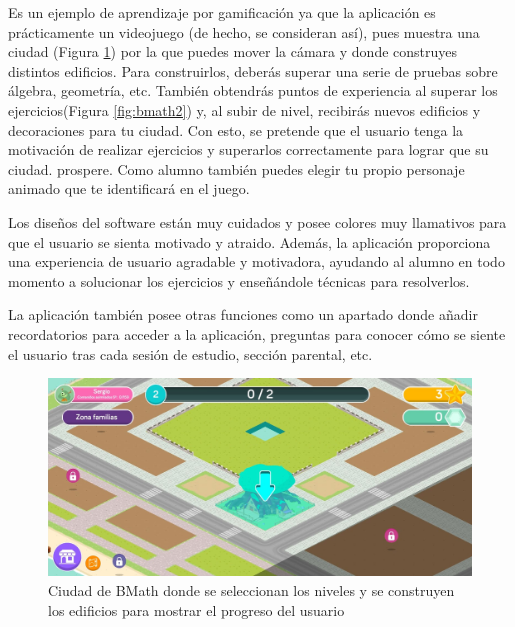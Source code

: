 Es un ejemplo de aprendizaje por gamificación ya que la aplicación es prácticamente un videojuego (de hecho, se consideran así), pues muestra una ciudad
(Figura \ref{fig:bmath}) por la que puedes mover la cámara y donde construyes distintos edificios. Para construirlos, deberás superar
una serie de pruebas sobre álgebra, geometría, etc. También obtendrás puntos de experiencia al superar los ejercicios(Figura \ref{fig:bmath2}) y, al subir de nivel, recibirás nuevos edificios y decoraciones para tu ciudad.
Con esto, se pretende que el usuario tenga la motivación de realizar ejercicios y superarlos correctamente para lograr que su ciudad.
prospere. Como alumno también puedes elegir tu propio personaje animado que te identificará en el juego.

Los diseños del software están muy cuidados y posee colores muy llamativos para que el usuario se sienta motivado y atraido. Además, la aplicación proporciona una experiencia 
de usuario agradable y motivadora, ayudando al alumno en todo momento 
a solucionar los ejercicios y enseñándole técnicas para resolverlos.

La aplicación también posee otras funciones como un apartado donde añadir recordatorios para acceder a la aplicación, preguntas para conocer cómo se siente el usuario tras cada sesión de estudio, sección parental, etc.

\begin{figure}[H]
    \centering
    \includegraphics[width=\textwidth]{imagenes/c2/bmath.jpeg}
    \caption{Ciudad de BMath donde se seleccionan los niveles y se construyen los edificios para mostrar el progreso del usuario}
    \label{fig:bmath}

\end{figure}

